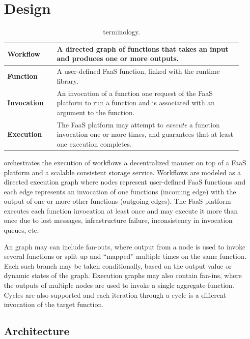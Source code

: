 \section{Design}\label{sec:design}

\begin{table}[]
  \centering
  \begin{tabular}{|m{0.2\linewidth}|m{0.75\linewidth}|}
    \hline
	\textbf{Workflow} & A directed graph of functions that takes an input and produces one or more outputs. \\
    \hline
	\textbf{Function} & A user-defined FaaS function, linked with the \name{} runtime library. \\
    \hline
	\textbf{Invocation} & An invocation of a function one request of the FaaS platform to run a function and is associated with an argument to the function. \\
    \hline
	\textbf{Execution} & The FaaS platform may attempt to \emph{execute} a function invocation one or more times, and guarantees that at least one execution completes. \\
    \hline
  \end{tabular}
  \caption{\name{} terminology.}
  \label{table:terms}
\end{table}

\name{} orchestrates the execution of workflows a decentralized manner on top of
a FaaS platform and a scalable consistent storage service. Workflows are modeled
as a directed execution graph where nodes represent user-defined FaaS functions
and each edge represents an invocation of one functions (incoming edge) with the
output of one or more other functions (outgoing edges). The FaaS platform
executes each function invocation at least once and may execute it more than
once due to lost messages, infrastructure failure, inconsistency in invocation
queues, etc.

An \name{} graph may can include fan-outs, where output from a node is used to
invoke several functions or split up and ``mapped'' multiple times on the same
function. Each such branch may be taken conditionally, based on the output value
or dynamic states of the graph. Execution graphs may also contain fan-ins, where
the outputs of multiple nodes are used to invoke a single aggregate function.
Cycles are also supported and each iteration through a cycle is a different
invocation of the target function.

\subsection{Architecture}\label{sec:design:architecture}

